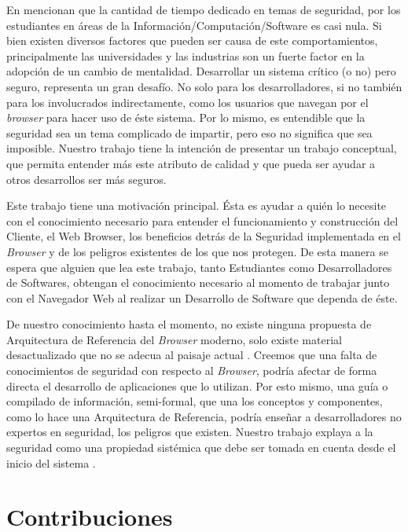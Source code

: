 En \cite{goertzel2007software, WhyteHarrison} mencionan que la cantidad de tiempo dedicado en temas de seguridad, por los estudiantes en áreas de la Información/Computación/Software es casi nula. Si bien existen diversos factores \cite{WhyteHarrison} que pueden ser causa de este comportamientos, principalmente las universidades y las industrias son un fuerte factor en la adopción de un cambio de mentalidad. Desarrollar un sistema crítico (o no) pero seguro, representa un gran desafío. No solo para los desarrolladores, si no también para los involucrados indirectamente, como los usuarios que navegan por el \textit{browser} para hacer uso de éste sistema. Por lo mismo, es entendible que la seguridad sea un tema complicado de impartir, pero eso no significa que sea imposible. Nuestro trabajo tiene la intención de presentar un trabajo conceptual, que permita entender más este atributo de calidad y que pueda ser ayudar a otros desarrollos ser más seguros.

Este trabajo tiene una motivación principal. Ésta es ayudar a quién lo necesite con el conocimiento necesario para entender el funcionamiento y construcción del Cliente, el Web Browser, los beneficios detrás de la Seguridad implementada en el \textit{Browser} y de los peligros existentes de los que nos protegen. De esta manera se espera que alguien que lea este trabajo, tanto Estudiantes como Desarrolladores de Softwares, obtengan el conocimiento necesario al momento de trabajar junto con el Navegador Web al realizar un Desarrollo de Software que dependa de éste.

De nuestro conocimiento hasta el momento, no existe ninguna propuesta de Arquitectura de Referencia del \textit{Browser} moderno, solo existe material desactualizado que no se adecua al paisaje actual \cite{2005-grosskurth-browser-refarch}. Creemos que una falta de conocimientos de seguridad con respecto al \textit{Browser}, podría afectar de forma directa el desarrollo de aplicaciones que lo utilizan. Por esto mismo, una guía o compilado de información, semi-formal, que una los conceptos y componentes, como lo hace una Arquitectura de Referencia, podría enseñar a desarrolladores no expertos en seguridad, los peligros que existen. Nuestro trabajo explaya a la seguridad como una propiedad sistémica que debe ser tomada en cuenta desde el inicio del sistema \cite{fernandez2004methodology, fernandez2006defining, braz2008eliciting, fernandez2013security, Fernandez2011}.


\section{Contribuciones}
\label{chap1:contr}

